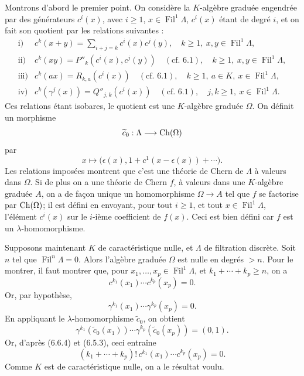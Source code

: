 \documentclass[11pt]{article}
\newcommand{\Fil}{\operatorname{Fil}}
\begin{document}
Montrons d'abord le premier point. On considère la \(K\)-algèbre graduée engendrée par des générateurs \(c^i(x)\), avec \(i\ge1\), \(x\in\Fil^1\Lambda\), \(c^i(x)\) étant de degré \(i\), et on fait son quotient par les relations suivantes :
\[
\begin{array}{ll}
\text{i)}&
 c^k(x+y)=\displaystyle\sum_{i+j=k}c^i(x)c^j(y),
 \quad k\ge1,\ x,y\in\Fil^1\Lambda,\\[0.8em]
\text{ii)}&
 c^k(xy)=P''_k(c^i(x),c^j(y))
 \quad(\text{cf. }6.1),
 \quad k\ge1,\ x,y\in\Fil^1\Lambda,\\[0.4em]
\text{iii)}&
 c^k(ax)=R_{k,a}(c^i(x))
 \quad(\text{cf. }6.1),
 \quad k\ge1,\ a\in K,\ x\in\Fil^1\Lambda,\\[0.4em]
\text{iv)}&
 c^k(\gamma^j(x))=Q''_{j,k}(c^i(x))
 \quad(\text{cf. }6.1),
 \quad j,k\ge1,\ x\in\Fil^1\Lambda.
\end{array}
\]
Ces relations étant isobares, le quotient est une \(K\)-algèbre graduée \(\Omega\). On définit un morphisme
\[
  \widetilde c_0:\Lambda\longrightarrow \operatorname{Ch}(\Omega)
\]
par
\[
  x\longmapsto
  \bigl(\epsilon(x),1+c^1(x-\epsilon(x))+\cdots\bigr).
\]
Les relations imposées montrent que c'est une théorie de Chern de \(\Lambda\) à valeurs dans \(\Omega\). Si de plus on a une théorie de Chern \(f\), à valeurs dans une \(K\)-algèbre graduée \(A\), on a de façon unique un homomorphisme \(\Omega\to A\) tel que \(f\) se factorise par \(\operatorname{Ch}(\Omega)\); il est défini en envoyant, pour tout \(i\ge1\), et tout \(x\in\Fil^1\Lambda\), l'élément \(c^i(x)\) sur le \(i\)-ième coefficient de \(f(x)\). Ceci est bien défini car \(f\) est un \(\lambda\)-homomorphisme.

Supposons maintenant \(K\) de caractéristique nulle, et \(\Lambda\) de filtration discrète. Soit \(n\) tel que \(\Fil^n\Lambda=0\). Alors l'algèbre graduée \(\Omega\) est nulle en degrés \(>n\). Pour le montrer, il faut montrer que, pour \(x_1,\ldots,x_p\in\Fil^1\Lambda\), et \(k_1+\cdots+k_p\ge n\), on a
\[
  c^{k_1}(x_1)\cdots c^{k_p}(x_p)=0.
\]
Or, par hypothèse,
\[
  \gamma^{k_1}(x_1)\cdots\gamma^{k_p}(x_p)=0.
\]
En appliquant le \(\lambda\)-homomorphisme \(\widetilde c_0\), on obtient
\[
  \gamma^{k_1}(\widetilde c_0(x_1))\cdots
  \gamma^{k_p}(\widetilde c_0(x_p))=(0,1).
\]
Or, d'après (6.6.4) et (6.5.3), ceci entraîne
\[
  (k_1+\cdots+k_p)!\,
  c^{k_1}(x_1)\cdots c^{k_p}(x_p)=0.
\]
Comme \(K\) est de caractéristique nulle, on a le résultat voulu.
\end{document}

